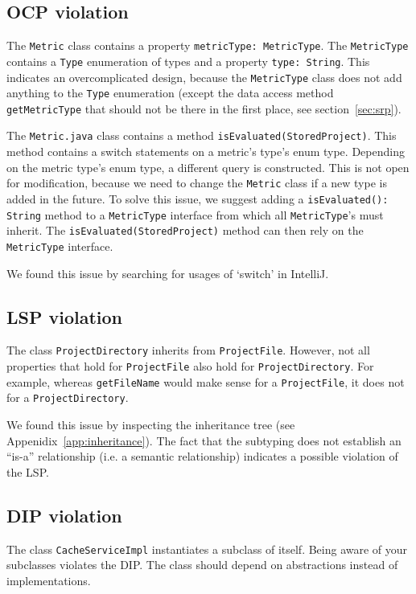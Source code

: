 \documentclass{article}
\begin{document}
\subsection{OCP violation}
The \verb|Metric| class contains a property \verb|metricType: MetricType|. The \verb|MetricType| contains a \verb|Type| enumeration of types and a property \verb|type: String|. This indicates an overcomplicated design, because the \verb|MetricType| class does not add anything to the \verb|Type| enumeration (except the data access method \verb|getMetricType| that should not be there in the first place, see section~\ref{sec:srp}).

The \verb|Metric.java| class contains a method \verb|isEvaluated(StoredProject)|. This method contains a switch statements on a metric's type's enum type. Depending on the metric type's enum type, a different query is constructed. This is not open for modification, because we need to change the \verb|Metric| class if a new type is added in the future. To solve this issue, we suggest adding a \verb|isEvaluated(): String| method to a \verb|MetricType| interface from which all \verb|MetricType|'s must inherit. The \verb|isEvaluated(StoredProject)| method can then rely on the \verb|MetricType| interface.

We found this issue by searching for usages of `switch' in IntelliJ.

\subsection{LSP violation}
The class \verb|ProjectDirectory| inherits from \verb|ProjectFile|. However, not all properties that hold for \verb|ProjectFile| also hold for \verb|ProjectDirectory|. For example, whereas \verb|getFileName| would make sense for a \verb|ProjectFile|, it does not for a \verb|ProjectDirectory|.

We found this issue by inspecting the inheritance tree (see Appenidix~\ref{app:inheritance}). The fact that the subtyping does not establish an ``is-a'' relationship (i.e. a semantic relationship) indicates a possible violation of the LSP.

\subsection{DIP violation}
The class \verb|CacheServiceImpl| instantiates a subclass of itself. Being aware of your subclasses violates the DIP. The class should depend on abstractions instead of implementations.
\end{document}
